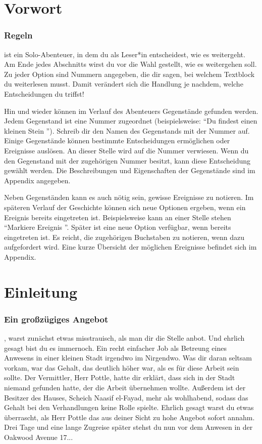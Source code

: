 
\chapter*{Vorwort}

\subsection{Regeln}

 ist ein Solo-Abenteuer, in dem du als Leser*in entscheidest, wie es weitergeht.
Am Ende jedes Abschnitts wirst du vor die Wahl gestellt, wie es weitergehen soll.
Zu jeder Option sind Nummern angegeben, die dir sagen, bei welchem Textblock du weiterlesen musst.
Damit verändert sich die Handlung je nachdem, welche Entscheidungen du triffst!

Hin und wieder können im Verlauf des Abenteuers Gegenstände gefunden werden. 
Jedem Gegenstand ist eine Nummer zugeordnet (beispielsweise: ``Du findest einen kleinen Stein ''). 
Schreib dir den Namen des Gegenstands mit der Nummer auf. 
Einige Gegenstände können bestimmte Entscheidungen ermöglichen oder Ereignisse auslösen. 
An dieser Stelle wird auf die Nummer verwiesen. 
Wenn du den Gegenstand mit der zugehörigen Nummer besitzt, kann diese Entscheidung gewählt werden. 
Die Beschreibungen und Eigenschaften der Gegenstände sind im Appendix angegeben. 

Neben Gegenständen kann es auch nötig sein, gewisse Ereignisse zu notieren. 
Im späteren Verlauf der Geschichte können sich neue Optionen ergeben, wenn ein Ereignis bereits eingetreten ist.
Beispielsweise kann an einer Stelle stehen ``Markiere Ereignis ''.
Später ist eine neue Option verfügbar, wenn  bereits eingetreten ist. 
Es reicht, die zugehörigen Buchstaben zu notieren, wenn dazu aufgefordert wird. 
Eine kurze Übersicht der möglichen Ereignisse befindet sich im Appendix.

\chapter*{Einleitung}

\subsection{Ein großzügiges Angebot}

, warst zunächst etwas misstrauisch, als man dir die Stelle anbot.
Und ehrlich gesagt bist du es immernoch.
Ein recht einfacher Job als Betreung eines Anwesens in einer kleinen Stadt irgendwo im Nirgendwo.
Was dir daran seltsam vorkam, war das Gehalt, das deutlich höher war, als es für diese Arbeit sein sollte.
Der Vermittler, Herr Pottle, hatte dir erklärt, dass sich in der Stadt niemand gefunden hatte, der die Arbeit übernehmen wollte.
Außerdem ist der Besitzer des Hauses, Scheich Naasif el-Fayad, mehr als wohlhabend, sodass das Gehalt bei den Verhandlungen keine Rolle spielte.
Ehrlich gesagt warst du etwas überrascht, als Herr Pottle das aus deiner Sicht zu hohe Angebot sofort annahm. 
Drei Tage und eine lange Zugreise später stehst du nun vor dem Anwesen in der Oakwood Avenue 17...

